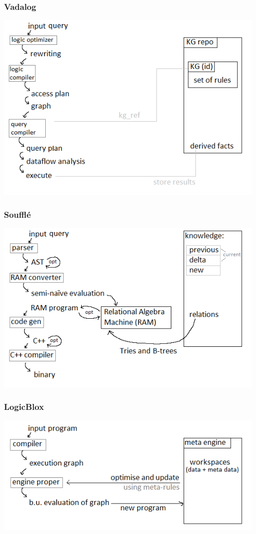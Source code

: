 \documentclass[aspectratio=169]{beamer}
\begin{document}
\begin{frame}
	\frametitle{Vadalog}
	\begin{center}
	\includegraphics[scale=.6]{figures/vadalog.png}
	\end{center}
\end{frame}

\begin{frame}
	\frametitle{Soufflé}
	\begin{center}
	\includegraphics[scale=.6]{figures/souffle.png}
	\end{center}
\end{frame}

\begin{frame}
	\frametitle{LogicBlox}
	\begin{center}
	\includegraphics[scale=.6]{figures/logicblox.png}
	\end{center}
\end{frame}
\end{document}
